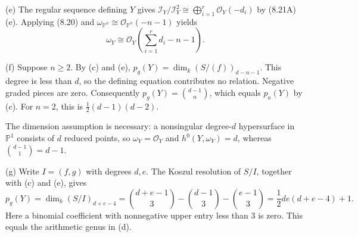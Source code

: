 (e) The regular sequence defining $Y$ gives $\mathcal I_Y/\mathcal I_Y^2\cong\bigoplus_{i=1}^r\mathcal O_Y(-d_i)$ by (8.21A)(e). Applying (8.20) and $\omega_{\mathbb P^n}\cong\mathcal O_{\mathbb P^n}(-n-1)$ yields
\[\omega_Y\cong\mathcal O_Y\left(\sum_{i=1}^r d_i-n-1\right).\]

(f) Suppose $n\ge2$. By (c) and (e), $p_g(Y)=\dim_k(S/(f))_{d-n-1}$. This degree is less than $d$, so the defining equation contributes no relation. Negative graded pieces are zero. Consequently $p_g(Y)=\binom{d-1}{n}$, which equals $p_a(Y)$ by (c). For $n=2$, this is $\frac12(d-1)(d-2)$.

The dimension assumption is necessary: a nonsingular degree-$d$ hypersurface in $\mathbb P^1$ consists of $d$ reduced points, so $\omega_Y=\mathcal O_Y$ and $h^0(Y,\omega_Y)=d$, whereas $\binom{d-1}{1}=d-1$.

(g) Write $I=(f,g)$ with degrees $d,e$. The Koszul resolution of $S/I$, together with (c) and (e), gives
\[p_g(Y)=\dim_k(S/I)_{d+e-4}=\binom{d+e-1}{3}-\binom{d-1}{3}-\binom{e-1}{3}=\frac12de(d+e-4)+1.\]
Here a binomial coefficient with nonnegative upper entry less than $3$ is zero. This equals the arithmetic genus in (d).

